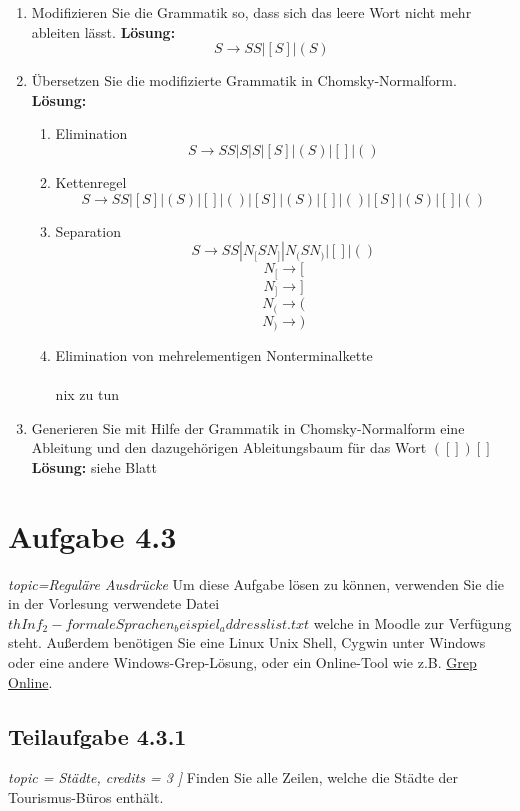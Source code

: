 \documentclass[12pt]{article}
\begin{document}
 \begin{enumerate} 
 \item Modifizieren Sie die Grammatik so, dass sich das leere Wort nicht mehr ableiten lässt. 
\textbf{ Lösung:
}  \[ 
 S\rightarrow  SS | [S] | (S)  
 \]
 \item Übersetzen Sie die modifizierte Grammatik in Chomsky-Normalform. 
 \textbf{ Lösung:}
 \begin{enumerate}
 \item Elimination 
 $$ S\rightarrow  SS | S | S | [S] | (S) | [] | () $$
  \item Kettenregel
 $$ S\rightarrow  SS | [S] | (S) | [] | () | [S] | (S) | [] | () | [S] | (S) | [] | () $$
 \item Separation
  $$ S\rightarrow  SS | N_[SN_] | N_(SN_) | [] | () $$
  $$ N_[ \rightarrow [ $$
$$ N_] \rightarrow ] $$
$$ N_( \rightarrow ( $$
$$ N_) \rightarrow ) $$  
  \item  Elimination von mehrelementigen Nonterminalkette\\\\
  nix zu tun 
  
 \end{enumerate}

 \item Generieren Sie mit Hilfe der Grammatik in Chomsky-Normalform eine Ableitung und den dazugehörigen Ableitungsbaum für das Wort $([])[]$  
 \textbf{ Lösung:}
 siehe Blatt 
 \end{enumerate} 
  
  
  
 \section*{Aufgabe 4.3}  
\emph{ topic={Reguläre Ausdrücke} }
 Um diese Aufgabe lösen zu können, verwenden Sie die in der Vorlesung verwendete Datei \\
  $thInf_2-formaleSprachen_beispiel_addresslist.txt$ welche in Moodle zur Verfügung steht.
  Außerdem benötigen Sie eine Linux Unix Shell, Cygwin unter Windows oder eine andere Windows-Grep-Lösung, oder ein Online-Tool wie z.B. \href{http://www.online-utility.org/text/grep.jsp}{Grep Online}. 
  
  
 \subsection*{Teilaufgabe 4.3.1} 
\emph{ topic = {Städte}, 
 credits = 3 
 ]} 
 Finden Sie alle Zeilen, welche die Städte der Tourismus-Büros enthält.  
  
\end{document}
